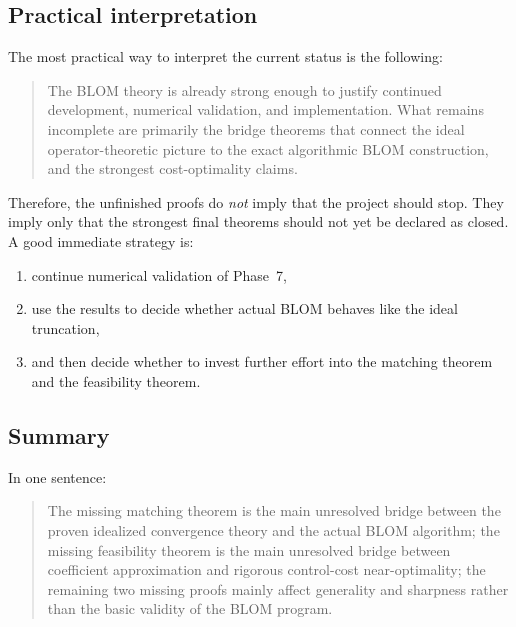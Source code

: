 \subsection{Practical interpretation}
\label{subsec:unfinished_practical_interpretation}

The most practical way to interpret the current status is the following:

\begin{quote}
	The BLOM theory is already strong enough to justify continued development, numerical validation, and implementation.
	What remains incomplete are primarily the bridge theorems that connect the ideal operator-theoretic picture to the exact algorithmic BLOM construction, and the strongest cost-optimality claims.
\end{quote}

Therefore, the unfinished proofs do \emph{not} imply that the project should stop.
They imply only that the strongest final theorems should not yet be declared as closed.
A good immediate strategy is:
\begin{enumerate}
	\item continue numerical validation of Phase~7,
	\item use the results to decide whether actual BLOM behaves like the ideal truncation,
	\item and then decide whether to invest further effort into the matching theorem and the feasibility theorem.
\end{enumerate}

\subsection{Summary}
\label{subsec:unfinished_summary}

In one sentence:

\begin{quote}
	The missing matching theorem is the main unresolved bridge between the proven idealized convergence theory and the actual BLOM algorithm; the missing feasibility theorem is the main unresolved bridge between coefficient approximation and rigorous control-cost near-optimality; the remaining two missing proofs mainly affect generality and sharpness rather than the basic validity of the BLOM program.
\end{quote}